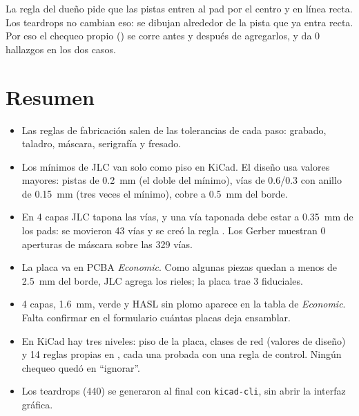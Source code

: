 \begin{ojo}
La regla del dueño pide que las pistas entren al pad por el centro y en línea recta. Los teardrops no cambian eso:
se dibujan alrededor de la pista que ya entra recta. Por eso el chequeo propio () se corre
antes y después de agregarlos, y da 0 hallazgos en los dos casos.
\end{ojo}

\section*{Resumen}
\begin{itemize}
  \item Las reglas de fabricación salen de las tolerancias de cada paso: grabado, taladro, máscara, serigrafía y
        fresado.
  \item Los mínimos de JLC van solo como piso en KiCad. El diseño usa valores mayores: pistas de
        \SI{0.2}{\milli\meter} (el doble del mínimo), vías de 0.6/0.3 con anillo de \SI{0.15}{\milli\meter} (tres veces
        el mínimo), cobre a \SI{0.5}{\milli\meter} del borde.
  \item En 4 capas JLC tapona las vías, y una vía taponada debe estar a \SI{0.35}{\milli\meter} de los pads: se
        movieron 43 vías y se creó la regla . Los Gerber muestran 0 aperturas de
        máscara sobre las 329 vías.
  \item La placa va en PCBA \emph{Economic}. Como algunas piezas quedan a menos de \SI{2.5}{\milli\meter} del borde,
        JLC agrega los rieles; la placa trae 3 fiduciales.
  \item 4 capas, \SI{1.6}{\milli\meter}, verde y HASL sin plomo aparece en la tabla de \emph{Economic}. Falta
        confirmar en el formulario cuántas placas deja ensamblar.
  \item En KiCad hay tres niveles: piso de la placa, clases de red (valores de diseño) y 14 reglas propias en
        , cada una probada con una regla de control. Ningún chequeo quedó en ``ignorar''.
  \item Los teardrops (440) se generaron al final con \texttt{kicad-cli}, sin abrir la interfaz gráfica.
\end{itemize}
